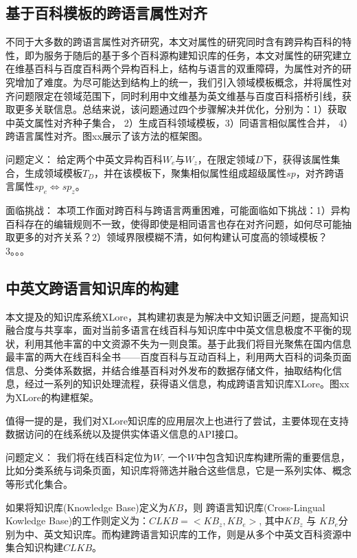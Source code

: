 \subsection{基于百科模板的跨语言属性对齐}
不同于大多数的跨语言属性对齐研究，本文对属性的研究同时含有跨异构百科的特性，即为服务于随后的基于多个百科源构建知识库的任务，本文对属性的研究建立在维基百科与百度百科两个异构百科上，结构与语言的双重障碍，为属性对齐的研究增加了难度。为尽可能达到结构上的统一，我们引入领域模板概念，并将属性对齐问题限定在领域范围下，同时利用中文维基为英文维基与百度百科搭桥引线，获取更多关联信息。总结来说，该问题通过四个步骤解决并优化，分别为：1）获取中英文属性对齐种子集合， 2）生成百科领域模板，3）同语言相似属性合并， 4）跨语言属性对齐。图xx展示了该方法的框架图。

{\heiti 问题定义：} 给定两个中英文异构百科$W_{e}$与$W_{z}$，在限定领域$D$下，获得该属性集合，生成领域模板${T_{D}}$，并在该模板下，聚集相似属性组成超级属性$sp$，对齐跨语言属性$sp_{e} \Leftrightarrow sp_{z}$。

{\heiti 面临挑战：} 本项工作面对跨百科与跨语言两重困难，可能面临如下挑战：1）异构百科存在的编辑规则不一致，使得即使是相同语言也存在对齐问题，如何尽可能抽取更多的对齐关系？2）领域界限模糊不清，如何构建认可度高的领域模板？ 3。。。


\subsection{中英文跨语言知识库的构建}
本文提及的知识库系统XLore，其构建初衷是为解决中文知识匮乏问题，提高知识融合度与共享率，面对当前多语言在线百科与知识库中中英文信息极度不平衡的现状，利用其他丰富的中文资源不失为一则良策。基于此我们将目光聚焦在国内信息最丰富的两大在线百科全书——百度百科与互动百科上，利用两大百科的词条页面信息、分类体系数据，并结合维基百科对外发布的数据存储文件，抽取结构化信息，经过一系列的知识处理流程，获得语义信息，构成跨语言知识库XLore。图xx为XLore的构建框架。

值得一提的是，我们对XLore知识库的应用层次上也进行了尝试，主要体现在支持数据访问的在线系统以及提供实体语义信息的API接口。

{\heiti 问题定义：} 我们将在线百科定位为$W$, 一个$W$中包含知识库构建所需的重要信息，比如分类系统与词条页面，知识库将筛选并融合这些信息，它是一系列实体、概念等形式化集合。

如果将知识库(Knowledge Base)定义为$KB$，则
跨语言知识库({\heiti C}ross-{\heiti L}ingual {\heiti K}owledge {\heiti B}ase)的工作则定义为：$CLKB = <KB_{z}, KB_{e}>$, 其中$KB_{z}$ 与 $KB_{e}$分别为中、英文知识库。而构建跨语言知识库的工作，则是从多个中英文百科资源中集合知识构建$CLKB$。

